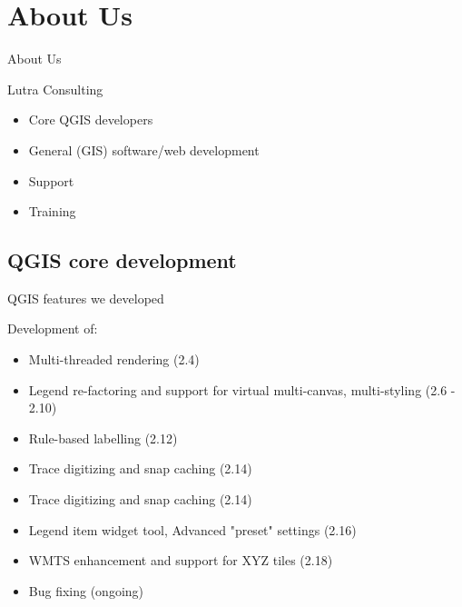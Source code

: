 \section{About Us}

\begin{frame}{About Us}
	\begin{block}{Lutra Consulting}
		\begin{itemize}
			\item Core QGIS developers
			\item General (GIS) software/web development
			\item Support
			\item Training
		\end{itemize}
	\end{block}
\end{frame}

\subsection{QGIS core development}
\begin{frame}{QGIS features we developed}
\begin{block}{Development of:}
	\begin{itemize}
		\item Multi-threaded rendering (2.4)
		\item Legend re-factoring and support for virtual multi-canvas, multi-styling (2.6 - 2.10)
		\item Rule-based labelling (2.12)
		\item Trace digitizing and snap caching (2.14)
		\item Trace digitizing and snap caching (2.14)
		\item Legend item widget tool, Advanced "preset" settings (2.16)
		\item WMTS enhancement and support for XYZ tiles (2.18)
		\item Bug fixing (ongoing)
	\end{itemize}
\end{block}
\end{frame}



